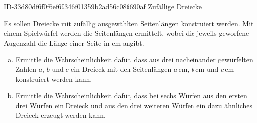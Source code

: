 \begin{exercise}
\begin{center}
    \end{center}
  \fi
\end{exercise}

\begin{exercise}
      {ID-33d80df6f0f6ef69346f01359b2ad56c086690af}
      {Zufällige Dreiecke}
  \ifproblem\problem\par
    Es sollen Dreiecke mit zufällig ausgewählten
    Seitenlängen konstruiert werden. Mit einem
    Spielwürfel werden die Seitenlängen ermittelt,
    wobei die jeweils geworfene Augenzahl die
    Länge einer Seite in \si{\centi\metre} angibt.
    \begin{enumerate}[a)]
      \item Ermittle die Wahrscheinlichkeit dafür,
            dass aus drei nacheinander gewürfelten
            Zahlen $a$, $b$ und $c$ ein Dreieck mit
            den Seitenlängen
            $a$\,\si{\centi\metre},
            $b$\,\si{\centi\metre} und
            $c$\,\si{\centi\metre}
            konstruiert werden kann.
      \item Ermittle die Wahrscheinlichkeit dafür,
            dass bei sechs Würfen aus den ersten
            drei Würfen ein Dreieck und aus den
            drei weiteren Würfen ein dazu ähnliches
            Dreieck erzeugt werden kann.
    \end{enumerate}
  \fi
\end{exercise}

